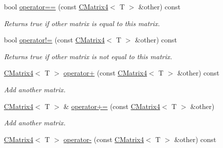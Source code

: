 \begin{DoxyCompactItemize}
\item 
bool \hyperlink{classirr_1_1core_1_1CMatrix4_a81029252a2a83ef4647f5d8a02cf62b5}{operator==} (const \hyperlink{classirr_1_1core_1_1CMatrix4}{C\+Matrix4}$<$ T $>$ \&other) const \hypertarget{classirr_1_1core_1_1CMatrix4_a81029252a2a83ef4647f5d8a02cf62b5}{}\label{classirr_1_1core_1_1CMatrix4_a81029252a2a83ef4647f5d8a02cf62b5}

\begin{DoxyCompactList}\small\item\em Returns true if other matrix is equal to this matrix. \end{DoxyCompactList}\item 
bool \hyperlink{classirr_1_1core_1_1CMatrix4_a99b4c127f31033b5f7314b98164b99ed}{operator!=} (const \hyperlink{classirr_1_1core_1_1CMatrix4}{C\+Matrix4}$<$ T $>$ \&other) const \hypertarget{classirr_1_1core_1_1CMatrix4_a99b4c127f31033b5f7314b98164b99ed}{}\label{classirr_1_1core_1_1CMatrix4_a99b4c127f31033b5f7314b98164b99ed}

\begin{DoxyCompactList}\small\item\em Returns true if other matrix is not equal to this matrix. \end{DoxyCompactList}\item 
\hyperlink{classirr_1_1core_1_1CMatrix4}{C\+Matrix4}$<$ T $>$ \hyperlink{classirr_1_1core_1_1CMatrix4_ac2192a7d9dd89dcd23fe2f9ded3252bf}{operator+} (const \hyperlink{classirr_1_1core_1_1CMatrix4}{C\+Matrix4}$<$ T $>$ \&other) const \hypertarget{classirr_1_1core_1_1CMatrix4_ac2192a7d9dd89dcd23fe2f9ded3252bf}{}\label{classirr_1_1core_1_1CMatrix4_ac2192a7d9dd89dcd23fe2f9ded3252bf}

\begin{DoxyCompactList}\small\item\em Add another matrix. \end{DoxyCompactList}\item 
\hyperlink{classirr_1_1core_1_1CMatrix4}{C\+Matrix4}$<$ T $>$ \& \hyperlink{classirr_1_1core_1_1CMatrix4_af91c5be0562ce4be3f8feedd3d017ba1}{operator+=} (const \hyperlink{classirr_1_1core_1_1CMatrix4}{C\+Matrix4}$<$ T $>$ \&other)\hypertarget{classirr_1_1core_1_1CMatrix4_af91c5be0562ce4be3f8feedd3d017ba1}{}\label{classirr_1_1core_1_1CMatrix4_af91c5be0562ce4be3f8feedd3d017ba1}

\begin{DoxyCompactList}\small\item\em Add another matrix. \end{DoxyCompactList}\item 
\hyperlink{classirr_1_1core_1_1CMatrix4}{C\+Matrix4}$<$ T $>$ \hyperlink{classirr_1_1core_1_1CMatrix4_aee45563e7f9fdf3d4ef7f5a9d63d87c0}{operator-\/} (const \hyperlink{classirr_1_1core_1_1CMatrix4}{C\+Matrix4}$<$ T $>$ \&other) const \hypertarget{classirr_1_1core_1_1CMatrix4_aee45563e7f9fdf3d4ef7f5a9d63d87c0}{}\label{classirr_1_1core_1_1CMatrix4_aee45563e7f9fdf3d4ef7f5a9d63d87c0}


\end{DoxyCompactItemize}
